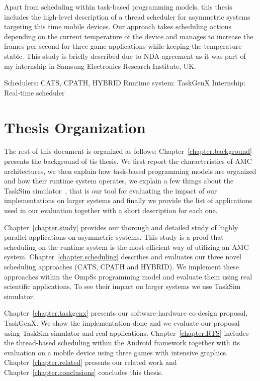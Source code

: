 Apart from scheduling within task-based programming models, this thesis includes the high-level description of a thread scheduler for asymmetric systems targeting this time mobile devices.
Our approach takes scheduling actions depending on the current temperature of the device and manages to increase the frames per second for three game applications while keeping the temperature stable.
This study is briefly described due to NDA agreement as it was part of my internship in Samsung Electronics Research Institute, UK.




Schedulers: CATS, CPATH, HYBRID
Runtime system: TaskGenX
Internship: Real-time scheduler


\section{Thesis Organization}
The rest of this document is organized as follows: 
Chapter~\ref{chapter.background} presents the background of tis thesis.
We first report the characteristics of AMC architectures, we then explain how task-based programming models are organized and how their runtime system operates, we explain a few things about the TaskSim simulator~\cite{AbstrLevels_TACO12}, that is our tool for evaluating the impact of our implementations on larger systems and finally we provide the list of applications used in our evaluation together with a short description for each one.

Chapter~\ref{chapter.study} provides our thorough and detailed study of highly parallel applications on asymmetric systems.
This study is a proof that scheduling on the runtime system is the most efficient way of utilizing an AMC system.
Chapter~\ref{chapter.scheduling} describes and evaluates our three novel scheduling approaches (CATS, CPATH and HYBRID). 
We implement these approaches within the OmpSs programming model and evaluate them using real scientific applications.
To see their impact on larger systems we use TaskSim simulator.

Chapter~\ref{chapter.taskgenx} presents our software-hardware co-design proposal, TaskGenX.
We show the implementation done and we evaluate our proposal using TaskSim simulator and real applications.
Chapter~\ref{chapter.RTS} includes the thread-based scheduling within the Android framework together with its evaluation on a mobile device using three games with intensive graphics.
Chapter~\ref{chapter.related} presents our related work and Chapter~\ref{chapter.conclusions} concludes this thesis.

